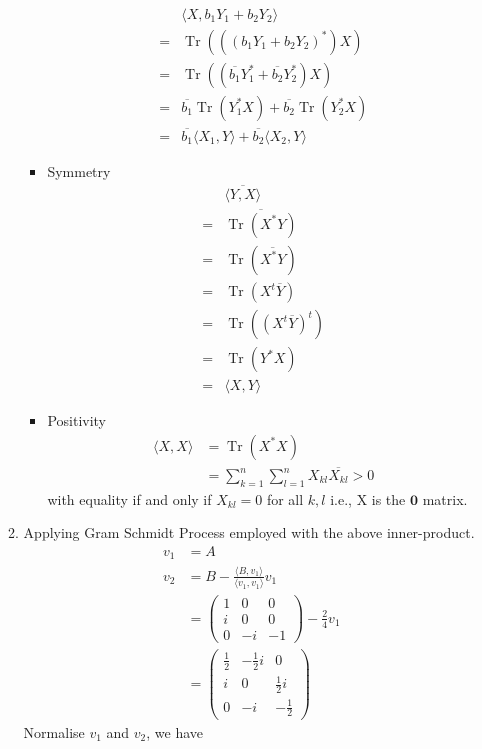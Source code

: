 \documentclass[12pt]{article}
\DeclareMathOperator{\Tr}{Tr}
\newcommand{\str}{^\ast}
\theoremstyle{definition}
\begin{document}
\begin{enumerate}
\begin{enumerate}
\begin{itemize}
\begin{align*}
    \end{align*}
     \begin{align*}
&\langle X,b_1Y_1+b_2Y_2\rangle\\ =&\Tr(((b_1Y_1+b_2Y_2)^\ast)X)\\=&\Tr((\overline{b_1}Y_1\str +\overline{b_2}Y_2\str)X) \\=&\overline{b_1}\Tr(Y_1^\ast X)+\overline{b_2}\Tr(Y_2^\ast X)\\=&\overline{b_1}\langle X_1,Y\rangle + \overline{b_2}\langle X_2,Y\rangle
    \end{align*}
    \item Symmetry
    \begin{align*}
    &\overline{\langle Y,X\rangle} \\
    =&\overline{\Tr(X^\ast Y)}\\
    =&\Tr(\overline{X^\ast Y})\\
    =&\Tr(X^t \overline{Y})\\
    =&\Tr((X^t \overline{Y})^t)\\
    =&\Tr(Y^\ast X)\\
    =&\langle X,Y\rangle
    \end{align*}
    \item Positivity 
    \begin{align*}
\langle X,X\rangle &= \Tr(X^\ast X)\\
&=\sum_{k=1}^n\sum_{l=1}^n X_{kl}\overline{X_{kl}}>0 
    \end{align*}
with equality if and only if  $X_{kl}=0$ for all $k,l$ i.e., X is the $\mathbf{0}$ matrix.
  \end{itemize}
  \item Applying Gram Schmidt Process employed with the above inner-product.
  \begin{align*}
  v_1&=A\\
  v_2 &= B-\frac{\langle B,v_1\rangle}{\langle v_1,v_1\rangle}v_1\\
  &= \begin{pmatrix}1&0&0\\i&0&0\\0&-i&-1\end{pmatrix}-\frac{2}{4}v_1\\
  &=\begin{pmatrix}\frac{1}{2}&-\frac{1}{2}i&0\\i&0&\frac{1}{2}i\\0&-i&-\frac{1}{2}\end{pmatrix}
  \end{align*}
  Normalise $v_1$ and $v_2$, we have

\end{enumerate}
\end{enumerate}
\end{document}
